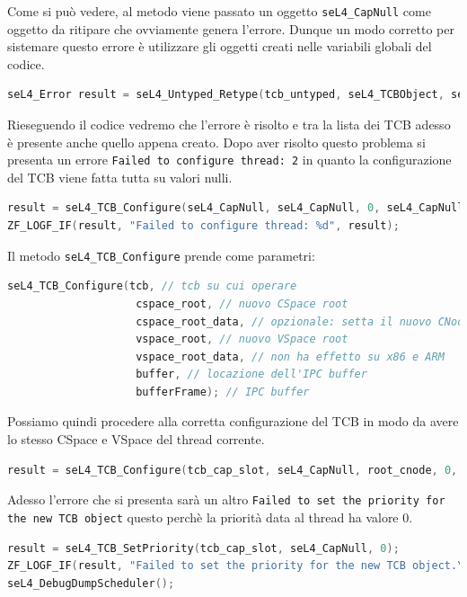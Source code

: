 Come si può vedere, al metodo viene passato un oggetto \texttt{seL4\_CapNull} come oggetto da ritipare che ovviamente genera l'errore. Dunque un modo corretto per sistemare questo errore è utilizzare gli oggetti creati nelle variabili globali del codice.
\begin{lstlisting}[language=C++]
seL4_Error result = seL4_Untyped_Retype(tcb_untyped, seL4_TCBObject, seL4_TCBBits, root_cnode, 0, 0, tcb_cap_slot, 1);
\end{lstlisting}

Rieseguendo il codice vedremo che l'errore è risolto e tra la lista dei TCB adesso è presente anche quello appena creato. Dopo aver risolto questo problema si presenta un errore \texttt{Failed to configure thread: 2} in quanto la configurazione del TCB viene fatta tutta su valori nulli.
\begin{lstlisting}[language=C++]
result = seL4_TCB_Configure(seL4_CapNull, seL4_CapNull, 0, seL4_CapNull, 0, 0, (seL4_Word) NULL, seL4_CapNull);
ZF_LOGF_IF(result, "Failed to configure thread: %d", result);
\end{lstlisting}

Il metodo \texttt{seL4\_TCB\_Configure} prende come parametri:
\begin{lstlisting}[language=C++]
seL4_TCB_Configure(tcb, // tcb su cui operare
					cspace_root, // nuovo CSpace root
					cspace_root_data, // opzionale: setta il nuovo CNode
					vspace_root, // nuovo VSpace root
					vspace_root_data, // non ha effetto su x86 e ARM
					buffer, // locazione dell'IPC buffer
					bufferFrame); // IPC buffer
\end{lstlisting} 

Possiamo quindi procedere alla corretta configurazione del TCB in modo da avere lo stesso CSpace e VSpace del thread corrente.
\begin{lstlisting}[language=C++]
result = seL4_TCB_Configure(tcb_cap_slot, seL4_CapNull, root_cnode, 0, root_vspace, 0, (seL4_Word) thread_ipc_buff_sym, tcb_ipc_frame);
\end{lstlisting}

Adesso l'errore che si presenta sarà un altro
\texttt{Failed to set the priority for the new TCB object} questo perchè la priorità data al thread ha valore 0.
\begin{lstlisting}[language=C++]
result = seL4_TCB_SetPriority(tcb_cap_slot, seL4_CapNull, 0);
ZF_LOGF_IF(result, "Failed to set the priority for the new TCB object.\n");
seL4_DebugDumpScheduler();
\end{lstlisting}

